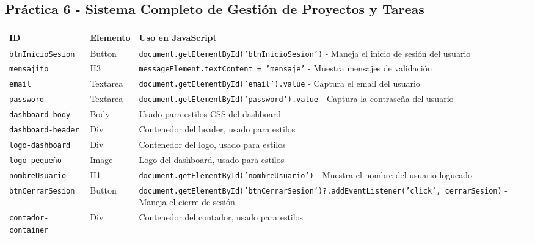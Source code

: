 \documentclass[12pt,a4paper]{article}
\begin{document}
\subsection{Práctica 6 - Sistema Completo de Gestión de Proyectos y Tareas}

\begin{longtable}{|p{4cm}|p{3cm}|p{8cm}|}
\hline
\rowcolor{lightgray}
\textbf{ID} & \textbf{Elemento} & \textbf{Uso en JavaScript} \\
\hline

\texttt{btnInicioSesion} & Button & \texttt{document.getElementById('btnInicioSesion')} - Maneja el inicio de sesión del usuario \\
\hline

\texttt{mensajito} & H3 & \texttt{messageElement.textContent = 'mensaje'} - Muestra mensajes de validación \\
\hline

\texttt{email} & Textarea & \texttt{document.getElementById('email').value} - Captura el email del usuario \\
\hline

\texttt{password} & Textarea & \texttt{document.getElementById('password').value} - Captura la contraseña del usuario \\
\hline

\texttt{dashboard-body} & Body & Usado para estilos CSS del dashboard \\
\hline

\texttt{dashboard-header} & Div & Contenedor del header, usado para estilos \\
\hline

\texttt{logo-dashboard} & Div & Contenedor del logo, usado para estilos \\
\hline

\texttt{logo-pequeño} & Image & Logo del dashboard, usado para estilos \\
\hline

\texttt{nombreUsuario} & H1 & \texttt{document.getElementById('nombreUsuario')} - Muestra el nombre del usuario logueado \\
\hline

\texttt{btnCerrarSesion} & Button & \texttt{document.getElementById('btnCerrarSesion')?.addEventListener('click', cerrarSesion)} - Maneja el cierre de sesión \\
\hline

\texttt{contador-container} & Div & Contenedor del contador, usado para estilos \\
\hline


\end{longtable}
\end{document}
